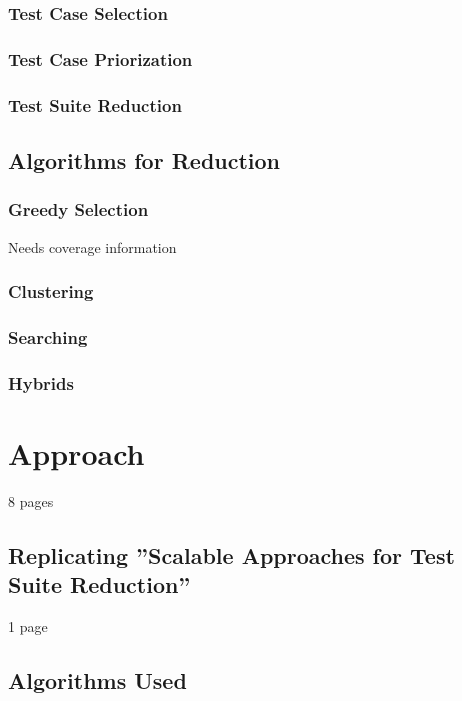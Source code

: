 \documentclass[a4paper,10pt]{article}
\begin{document}
\subsubsection{Test Case Selection}

\subsubsection{Test Case Priorization}

\subsubsection{Test Suite Reduction}

\subsection{Algorithms for Reduction}

\subsubsection{Greedy Selection}

Needs coverage information

\subsubsection{Clustering}

\subsubsection{Searching}

\subsubsection{Hybrids}

\section{Approach}

8 pages

\subsection{Replicating ''Scalable Approaches for Test Suite Reduction''}

1 page

\subsection{Algorithms Used}
\end{document}
